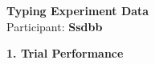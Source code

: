 \documentclass[10pt,a4paper]{article}
\begin{document}

\begin{center}
    {\Large\bfseries Typing Experiment Data}\\
    \vspace{2pt}
    Participant: \textbf{Ssdbb}
\end{center}

\vspace{0.25cm}


\noindent
{\large\bfseries 1. Trial Performance}

\vspace{0.08cm}
\end{document}
